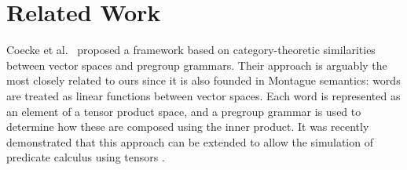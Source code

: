 \documentclass{svmult}
\begin{document}



\section{Related Work}


Coecke et al.~\cite{Coecke:10} proposed a framework based on category-theoretic
similarities between vector spaces and pregroup grammars. Their
approach is arguably the most closely related to ours since it is also
founded in Montague semantics: words are treated as linear functions
between vector spaces. Each word is represented as an element of a
tensor product space, and a pregroup grammar is used to determine how
these are composed using the inner product. It was recently
demonstrated that this approach can be extended to allow the
simulation of predicate calculus using
tensors \cite{Grefenstette:13}.
\end{document}

